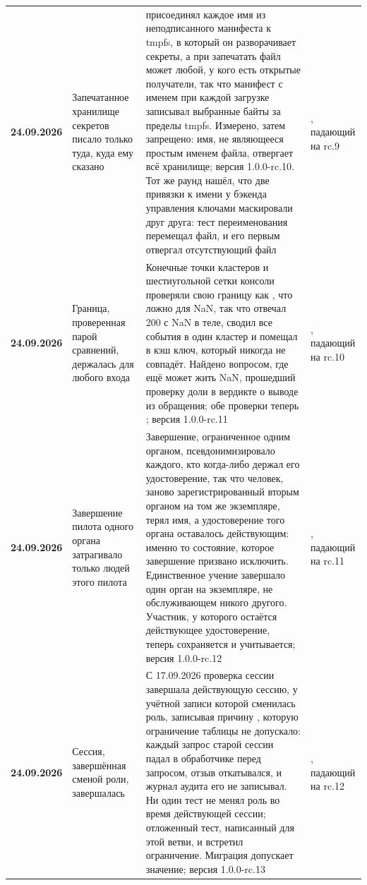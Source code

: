 {\begin{xltabular}{\textwidth}{>{\bfseries\hspace{0pt}}p{0.74in} >{\RaggedRight\arraybackslash\hspace{0pt}}X >{\RaggedRight\arraybackslash\hspace{0pt}}X >{\RaggedRight\arraybackslash\hspace{0pt}}p{1.6in}}
24.09.2026 & Запечатанное хранилище секретов писало только туда, куда ему сказано &  присоединял каждое имя из неподписанного манифеста к tmpfs, в который он разворачивает секреты, а при  запечатать файл может любой, у кого есть открытые получатели, так что манифест с именем  при каждой загрузке записывал выбранные байты за пределы tmpfs. Измерено, затем запрещено: имя, не являющееся простым именем файла, отвергает всё хранилище; версия 1.0.0-rc.10. Тот же раунд нашёл, что две привязки к имени у бэкенда управления ключами маскировали друг друга: тест переименования перемещал файл, и его первым отвергал отсутствующий файл & , падающий на rc.9 \\
24.09.2026 & Граница, проверенная парой сравнений, держалась для любого входа & Конечные точки кластеров и шестиугольной сетки консоли проверяли свою границу как , что ложно для NaN, так что  отвечал 200 с NaN в теле, сводил все события в один кластер и помещал в кэш ключ, который никогда не совпадёт. Найдено вопросом, где ещё может жить NaN, прошедший проверку доли в вердикте о выводе из обращения; обе проверки теперь ; версия 1.0.0-rc.11 & , падающий на rc.10 \\
24.09.2026 & Завершение пилота одного органа затрагивало только людей этого пилота & Завершение, ограниченное одним органом, псевдонимизировало каждого, кто когда-либо держал его удостоверение, так что человек, заново зарегистрированный вторым органом на том же экземпляре, терял имя, а удостоверение того органа оставалось действующим: именно то состояние, которое завершение призвано исключить. Единственное учение завершало один орган на экземпляре, не обслуживающем никого другого. Участник, у которого остаётся действующее удостоверение, теперь сохраняется и учитывается; версия 1.0.0-rc.12 & , падающий на rc.11 \\
24.09.2026 & Сессия, завершённая сменой роли, завершалась & С 17.09.2026 проверка сессии завершала действующую сессию, у учётной записи которой сменилась роль, записывая причину , которую ограничение таблицы не допускало: каждый запрос старой сессии падал в обработчике перед запросом, отзыв откатывался, и журнал аудита его не записывал. Ни один тест не менял роль во время действующей сессии; отложенный тест, написанный для этой ветви, и встретил ограничение. Миграция допускает значение; версия 1.0.0-rc.13 & , падающий на rc.12 \\

\end{xltabular}}
